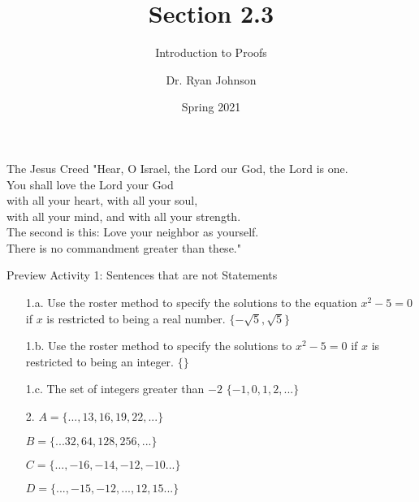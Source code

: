 \documentclass{beamer}
\title{Section 2.3}
\subtitle{Introduction to Proofs}
\author{Dr. Ryan Johnson}
\institute{Grace College}
\date{Spring 2021}
\begin{document}
\begin{frame}[plain]
    \maketitle
\end{frame}

\begin{frame}{The Jesus Creed}
\Large{
"Hear, O Israel, the Lord our God, the Lord is one.\\
You shall love the Lord your God\\
\;\; with all your heart, with all your soul,\\
\;\; with all your mind, and with all your strength.\\
The second is this: Love your neighbor as yourself.\\
There is no commandment greater than these."
}
\end{frame}

\begin{frame}{Preview Activity 1: Sentences that are not Statements}
	\begin{enumerate}
		\item[1.a.] Use the roster method to specify the solutions to the equation $x^2 - 5 = 0$ if $x$ is restricted to being a real number.  \pause $\{-\sqrt{5}, \sqrt{5}\}$ \\[.1 in] 
		\item[1.b.] Use the roster method to specify the solutions to $x^2 - 5 = 0$ if $x$ is restricted to being an integer. \pause $\{\}$ \\[.1 in] 
		\item[1.c.] The set of integers greater than $-2$ \pause $\{-1, 0, 1, 2, ...\}$ \\[.1 in] 
		\item[2.] \pause $A = \{...,13,16,19,22,...\}$
		
		$B = \{...32, 64, 128, 256, ...\}$
		
		$C = \{..., -16, -14, -12, -10...\}$
		
		$D = \{..., -15, -12, ..., 12, 15...\}$
	\end{enumerate}
\end{frame}
\end{document}
